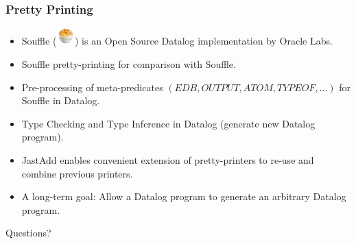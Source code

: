 \documentclass{beamer}
\begin{document}
\begin{frame}
\frametitle{Pretty Printing}
\begin{itemize}
\item<1-> Souffle (\includegraphics[width=20pt]{souffle.png}) is an Open Source Datalog implementation by Oracle Labs.
\item<2-> Souffle pretty-printing for comparison with Souffle.
\item<3-> Pre-processing of meta-predicates $(EDB, OUTPUT, ATOM, TYPEOF, ...)$ for Souffle in Datalog.
\item<4-> Type Checking and Type Inference in Datalog (generate new Datalog program).
\item<5-> JastAdd enables convenient extension of pretty-printers to re-use and combine previous printers.
\item<6-> A long-term goal: Allow a Datalog program to generate an arbitrary Datalog program.
\end{itemize}
\end{frame}

\begin{frame}

\centering \Huge Questions?

\end{frame}
\end{document}
